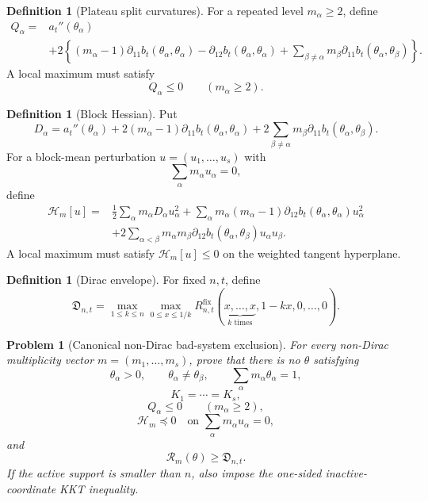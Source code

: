 \documentclass[11pt]{article}
\newtheorem{problem}[theorem]{Problem}
\theoremstyle{definition}
\newtheorem{definition}[theorem]{Definition}
\newcommand{\fix}{\mathrm{fix}}
\begin{document}
\begin{definition}[Plateau split curvatures]
For a repeated level $m_\alpha\ge2$, define
\[
\begin{aligned}
Q_\alpha
={}&a_t''(\theta_\alpha)\\
&+2\left\{(m_\alpha-1)\partial_{11}b_t(\theta_\alpha,\theta_\alpha)
-\partial_{12}b_t(\theta_\alpha,\theta_\alpha)
+\sum_{\beta\ne\alpha}m_\beta\partial_{11}b_t(\theta_\alpha,\theta_\beta)\right\}.
\end{aligned}
\]
A local maximum must satisfy
\[
  Q_\alpha\le0\qquad(m_\alpha\ge2).
\]
\end{definition}

\begin{definition}[Block Hessian]
Put
\[
D_\alpha
=a_t''(\theta_\alpha)
+2(m_\alpha-1)\partial_{11}b_t(\theta_\alpha,\theta_\alpha)
+2\sum_{\beta\ne\alpha}m_\beta\partial_{11}b_t(\theta_\alpha,\theta_\beta).
\]
For a block-mean perturbation $u=(u_1,\ldots,u_s)$ with
\[
  \sum_\alpha m_\alpha u_\alpha=0,
\]
define
\[
\begin{aligned}
\mathcal H_m[u]
={}&\frac12\sum_\alpha m_\alpha D_\alpha u_\alpha^2
+\sum_\alpha m_\alpha(m_\alpha-1)\partial_{12}b_t(\theta_\alpha,\theta_\alpha)u_\alpha^2\\
&+2\sum_{\alpha<\beta}m_\alpha m_\beta\partial_{12}b_t(\theta_\alpha,\theta_\beta)u_\alpha u_\beta.
\end{aligned}
\]
A local maximum must satisfy $\mathcal H_m[u]\le0$ on the weighted tangent hyperplane.
\end{definition}

\begin{definition}[Dirac envelope]
For fixed $n,t$, define
\[
  \mathfrak D_{n,t}
  =\max_{1\le k\le n}\max_{0\le x\le1/k}
  R_{n,t}^{\fix}(\underbrace{x,\ldots,x}_{k\text{ times}},1-kx,0,\ldots,0).
\]
\end{definition}

\begin{problem}[Canonical non-Dirac bad-system exclusion]\label{prob:bad-system}
For every non-Dirac multiplicity vector $m=(m_1,\ldots,m_s)$, prove that there is no $\theta$ satisfying
\[
  \theta_\alpha>0,
  \qquad \theta_\alpha\ne\theta_\beta,
  \qquad \sum_\alpha m_\alpha\theta_\alpha=1,
\]
\[
  K_1=\cdots=K_s,
\]
\[
  Q_\alpha\le0\qquad(m_\alpha\ge2),
\]
\[
  \mathcal H_m\preceq0
  \quad\text{on }\sum_\alpha m_\alpha u_\alpha=0,
\]
and
\[
  \mathcal R_m(\theta)\ge\mathfrak D_{n,t}.
\]
If the active support is smaller than $n$, also impose the one-sided inactive-coordinate KKT inequality.
\end{problem}
\end{document}
